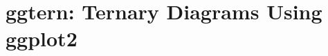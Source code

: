 \documentclass[article]{jss}
\begin{document}
\section*{ggtern: Ternary Diagrams Using ggplot2}




\newpage
\clearpage
\end{document}
